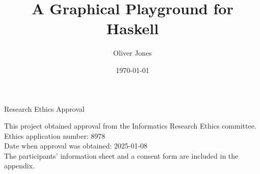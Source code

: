 \documentclass[../main.tex]{subfiles}
\begin{document}
\begin{preliminary}

    \title{A Graphical Playground for Haskell}
    \author{Oliver Jones}
    \date{\today}

    \abstract{
    }

    \maketitle

    \newenvironment{ethics}{
        \begin{frontenv}{Research Ethics Approval}{\LARGE}} {
        \end{frontenv}
        \newpage}

    \begin{ethics}

        This project obtained approval from the Informatics Research Ethics committee.
        \\
        Ethics application number: 8978
        \\
        Date when approval was obtained: 2025-01-08
        \\

        The participants' information sheet and a consent form are included in the
            appendix.
        \\


        \standarddeclaration
    \end{ethics}

    \begin{acknowledgements}
    \end{acknowledgements}

    \tableofcontents
\end{preliminary}
\end{document}
